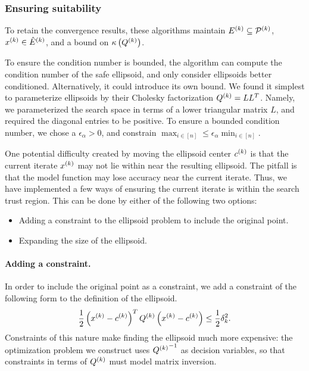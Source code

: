 \subsubsection{Ensuring suitability}

To retain the convergence results, these algorithms maintain ${E^{(k)}} \subseteq {{\mathcal{P}}^{(k)}}$,
$x^{(k)} \in {{\hat E}^{(k)}} $, and a bound on ${\kappa}\left({Q^{(k)}}\right)$.

To ensure the condition number is bounded, the algorithm can compute the condition number of the safe ellipsoid, and only consider ellipsoids better conditioned.
Alternatively, it could introduce its own bound.
We found it simplest to parameterize ellipsoids by their Cholesky factorization ${Q^{(k)}} = LL^T$.
Namely, we parameterized the search space in terms of a lower triangular matrix $L$, and required the diagonal entries to be positive.
To ensure a bounded condition number, we chose a $\epsilon_{\alpha} > 0$, and constrain  $\max_{i\in[n]} \le \epsilon_{\alpha} \min_{i \in [n]}$.

One potential difficulty created by moving the ellipsoid center $c^{(k)}$ is that the current iterate $x^{(k)}$ may not lie within near the resulting ellipsoid.   
The pitfall is that the model function may lose accuracy near the current iterate.
Thus, we have implemented a few ways of ensuring the current iterate is within the search trust region.
This can be done by either of the following two options:
\begin{itemize}
\item Adding a constraint to the ellipsoid problem to include the original point.
\item Expanding the size of the ellipsoid.
\end{itemize}

\paragraph*{Adding a constraint.}
In order to include the original point as a constraint, we add a constraint of the following form to the definition of the ellipsoid.
\begin{align*}
\frac 1 2 \left(x^{(k)} - c^{(k)}\right)^T{Q^{(k)}}\left(x^{(k)} - c^{(k)}\right) \le \frac 1 2 \delta_k^2.
\end{align*}
Constraints of this nature make finding the ellipsoid much more expensive:
the optimization problem we construct uses ${{Q^{(k)}}}^{-1}$ as decision variables, so that constraints in terms of ${Q^{(k)}}$ must model matrix inversion.

